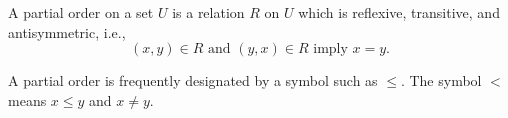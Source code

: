 A partial order on a set $U$ is a relation $R$ on $U$ which is reflexive, transitive, and antisymmetric, i.e.,
$$(x, y) \in R \text{ and } (y, x) \in R \text{ imply } x = y.$$

A partial order is frequently designated by a symbol such as $\leq$. The symbol $<$ means $x \leq y$ and $x \neq y$.
